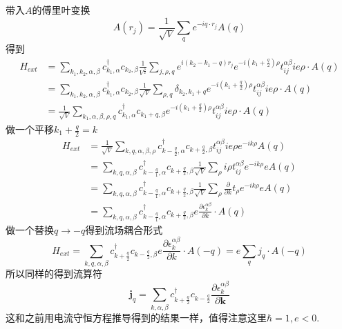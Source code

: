 \documentclass{article}
\numberwithin{equation}{subsection}
\begin{document}
带入$A$的傅里叶变换
\begin{equation}
    A(r_j)=\frac{1}{\sqrt{V}}\sum_{q}e^{-iq\cdot r_j}A(q)
\end{equation}
得到
\begin{equation}
    \begin{split}
        H_{ext}&=\sum_{k_1,k_2,\alpha,\beta}c_{k_1,\alpha}^\dagger c_{k_2,\beta}\frac{1}{V^{\frac{3}{2}}}\sum_{j,\rho,q}e^{i(k_2-k_1-q)r_j}e^{-i(k_1+\frac{q}{2})\rho}t_{ij}^{\alpha\beta}ie\rho\cdot A(q)\\
        &=\sum_{k_1,k_2,\alpha,\beta}c_{k_1,\alpha}^\dagger c_{k_2,\beta}\frac{1}{\sqrt{V}}\sum_{\rho,q}\delta_{k_2,k_1+q}e^{-i(k_1+\frac{q}{2})\rho}t_{ij}^{\alpha\beta}ie\rho\cdot A(q)\\
        &=\frac{1}{\sqrt{V}}\sum_{k_1,\alpha,\beta,\rho,q}c_{k_1,\alpha}^\dagger c_{k_1+q,\beta}e^{-i(k_1+\frac{q}{2})\rho}t_{ij}^{\alpha\beta}ie\rho\cdot A(q)
    \end{split}
\end{equation}
做一个平移$k_1+\frac{q}{2}=k$
\begin{equation}
    \begin{split}
        H_{ext}&=\frac{1}{\sqrt{V}}\sum_{k,q,\alpha,\beta,\rho}c_{k-\frac{q}{2},\alpha}^\dagger c_{k+\frac{q}{2},\beta}t_{ij}^{\alpha\beta}ie\rho e^{-ik\rho}A(q)\\
        &=\sum_{k,q,\alpha,\beta}c_{k-\frac{q}{1},\alpha}^\dagger c_{k+\frac{q}{2},\beta}\frac{1}{\sqrt{V}}\sum_{\rho}i\rho t_{ij}^{\alpha\beta}e^{-ik\rho}eA(q)\\
        &=\sum_{k,q,\alpha,\beta}c_{k-\frac{q}{1},\alpha}^\dagger c_{k+\frac{q}{2},\beta}\frac{1}{\sqrt{V}}\sum_{\rho}\frac{\partial}{\partial k} t_\rho e^{-ik\rho}eA(q)\\
        &=\sum_{k,q,\alpha,\beta}c_{k-\frac{q}{1},\alpha}^\dagger c_{k+\frac{q}{2},\beta}e\frac{\partial \epsilon_k^{\alpha\beta}}{\partial k}\cdot A(q)
    \end{split}
\end{equation}
做一个替换$q\rightarrow-q$得到流场耦合形式
\begin{equation}
    H_{ext}=\sum_{k,q,\alpha,\beta}c_{k+\frac{q}{2}}^\dagger c_{k-\frac{q}{2},\beta}e\frac{\partial\epsilon_k^{\alpha\beta}}{\partial k}\cdot A(-q)=e\sum_q j_q\cdot A(-q)
\end{equation}
所以同样的得到流算符
\begin{equation}
    \mathbf{j}_q=\sum_{k,\alpha,\beta}c_{k+\frac{q}{2}}^\dagger c_{k-\frac{q}{2}}\frac{\partial\epsilon_k^{\alpha\beta}}{\partial \mathbf{k}}
\end{equation}
这和之前用电流守恒方程推导得到的结果一样，值得注意这里$\hbar=1,e<0$.
\end{document}
